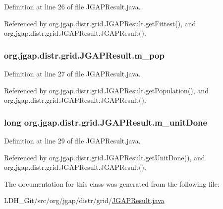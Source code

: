 Definition at line 26 of file J\-G\-A\-P\-Result.\-java.



Referenced by org.\-jgap.\-distr.\-grid.\-J\-G\-A\-P\-Result.\-get\-Fittest(), and org.\-jgap.\-distr.\-grid.\-J\-G\-A\-P\-Result.\-J\-G\-A\-P\-Result().

\hypertarget{classorg_1_1jgap_1_1distr_1_1grid_1_1_j_g_a_p_result_adb080da341ea89a9e87d57ceafae7248}{
\subsubsection[{m\-\_\-pop}]{ org.\-jgap.\-distr.\-grid.\-J\-G\-A\-P\-Result.\-m\-\_\-pop\hspace{0.3cm}{\ttfamily [private]}}}\label{classorg_1_1jgap_1_1distr_1_1grid_1_1_j_g_a_p_result_adb080da341ea89a9e87d57ceafae7248}


Definition at line 27 of file J\-G\-A\-P\-Result.\-java.



Referenced by org.\-jgap.\-distr.\-grid.\-J\-G\-A\-P\-Result.\-get\-Population(), and org.\-jgap.\-distr.\-grid.\-J\-G\-A\-P\-Result.\-J\-G\-A\-P\-Result().

\hypertarget{classorg_1_1jgap_1_1distr_1_1grid_1_1_j_g_a_p_result_a0d3a0f7ebc83c184752243eced88f08b}{
\subsubsection[{m\-\_\-unit\-Done}]{\setlength{\rightskip}{0pt plus 5cm}long org.\-jgap.\-distr.\-grid.\-J\-G\-A\-P\-Result.\-m\-\_\-unit\-Done\hspace{0.3cm}{\ttfamily [private]}}}\label{classorg_1_1jgap_1_1distr_1_1grid_1_1_j_g_a_p_result_a0d3a0f7ebc83c184752243eced88f08b}


Definition at line 29 of file J\-G\-A\-P\-Result.\-java.



Referenced by org.\-jgap.\-distr.\-grid.\-J\-G\-A\-P\-Result.\-get\-Unit\-Done(), and org.\-jgap.\-distr.\-grid.\-J\-G\-A\-P\-Result.\-J\-G\-A\-P\-Result().



The documentation for this class was generated from the following file\-:\begin{DoxyCompactItemize}
\item 
L\-D\-H\-\_\-\-Git/src/org/jgap/distr/grid/\hyperlink{_j_g_a_p_result_8java}{J\-G\-A\-P\-Result.\-java}\end{DoxyCompactItemize}
